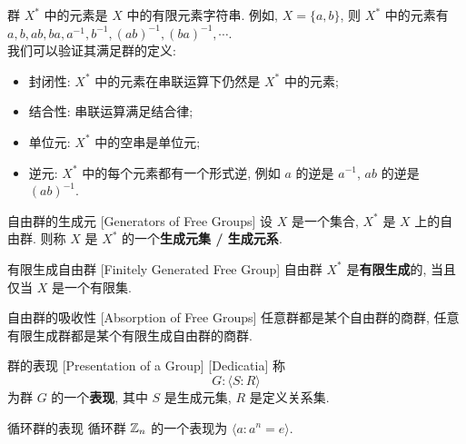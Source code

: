         \begin{rmk}
            [Dedicatia]
            群 \(X^*\) 中的元素是 \(X\) 中的有限元素字符串. 例如, \(X=\{a,b\}\), 则 \(X^*\) 中的元素有 \(a, b, ab, ba, a^{-1}, b^{-1}, (ab)^{-1}, (ba)^{-1}, \cdots\).\\
            我们可以验证其满足群的定义:
            \begin{itemize}
                \item 封闭性: \(X^*\) 中的元素在串联运算下仍然是 \(X^*\) 中的元素;
                \item 结合性: 串联运算满足结合律;
                \item 单位元: \(X^*\) 中的空串是单位元;
                \item 逆元: \(X^*\) 中的每个元素都有一个形式逆, 例如 \(a\) 的逆是 \(a^{-1}\), \(ab\) 的逆是 \((ab)^{-1}\).
            \end{itemize}
        \end{rmk}

        \begin{dfn}
            {自由群的生成元}
            [Generators of Free Groups]
            设 \(X\) 是一个集合, \(X^*\) 是 \(X\) 上的自由群. 则称 \(X\) 是 \(X^*\) 的一个\textbf{生成元集 / 生成元系}.
        \end{dfn}

        \begin{dfn}
            {有限生成自由群}
            [Finitely Generated Free Group]
            自由群 \(X^*\) 是\textbf{有限生成}的, 当且仅当 \(X\) 是一个有限集.
        \end{dfn}

        \begin{thm}
            {自由群的吸收性}
            [Absorption of Free Groups]
            任意群都是某个自由群的商群, 任意有限生成群都是某个有限生成自由群的商群.
        \end{thm}

        \begin{dfn}
            {群的表现}
            [Presentation of a Group]
            [Dedicatia]
            称
            \[G:\langle S : R \rangle\]
            为群 \(G\) 的一个\textbf{表现}, 其中 \(S\) 是生成元集, \(R\) 是定义关系集.
        \end{dfn}

        \begin{ins}
            {循环群的表现}
            循环群 \(\operatorname{\mathbb{Z}}_n\) 的一个表现为 \(\langle a: a^n=e\rangle\).
        \end{ins}

